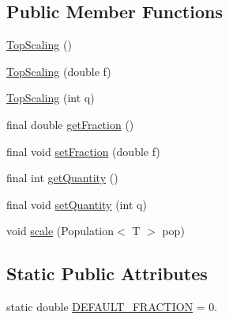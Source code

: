 \subsection*{Public Member Functions}
\begin{DoxyCompactItemize}
\item 
\hyperlink{classjenes_1_1stage_1_1operator_1_1common_1_1_top_scaling_3_01_t_01extends_01_chromosome_01_4_aa1be76204f86d57efff77e708cbcf2f9}{Top\-Scaling} ()
\item 
\hyperlink{classjenes_1_1stage_1_1operator_1_1common_1_1_top_scaling_3_01_t_01extends_01_chromosome_01_4_acb9c77ba5c63f60dcb5d27cf256c6d61}{Top\-Scaling} (double f)
\item 
\hyperlink{classjenes_1_1stage_1_1operator_1_1common_1_1_top_scaling_3_01_t_01extends_01_chromosome_01_4_adb3a002d09932e82a52f848cd4b8247e}{Top\-Scaling} (int q)
\item 
final double \hyperlink{classjenes_1_1stage_1_1operator_1_1common_1_1_top_scaling_3_01_t_01extends_01_chromosome_01_4_a4cb1be9e4948570a5f5d94ed97eb6cba}{get\-Fraction} ()
\item 
final void \hyperlink{classjenes_1_1stage_1_1operator_1_1common_1_1_top_scaling_3_01_t_01extends_01_chromosome_01_4_ab39c283ff0bb662ac76df11474ef133f}{set\-Fraction} (double f)
\item 
final int \hyperlink{classjenes_1_1stage_1_1operator_1_1common_1_1_top_scaling_3_01_t_01extends_01_chromosome_01_4_a165fa24c31055aecd832e837419bad6f}{get\-Quantity} ()
\item 
final void \hyperlink{classjenes_1_1stage_1_1operator_1_1common_1_1_top_scaling_3_01_t_01extends_01_chromosome_01_4_a53e27151e7c9b0b98e5c80e5018d2800}{set\-Quantity} (int q)
\item 
void \hyperlink{classjenes_1_1stage_1_1operator_1_1common_1_1_top_scaling_3_01_t_01extends_01_chromosome_01_4_afb5fd14e2cdb722a139193172c56ceaa}{scale} (Population$<$ T $>$ pop)
\end{DoxyCompactItemize}
\subsection*{Static Public Attributes}
\begin{DoxyCompactItemize}
\item 
static double \hyperlink{classjenes_1_1stage_1_1operator_1_1common_1_1_top_scaling_3_01_t_01extends_01_chromosome_01_4_af21f9346a23ebaab4d7a5bd4367edafe}{D\-E\-F\-A\-U\-L\-T\-\_\-\-F\-R\-A\-C\-T\-I\-O\-N} = 0.
\end{DoxyCompactItemize}
